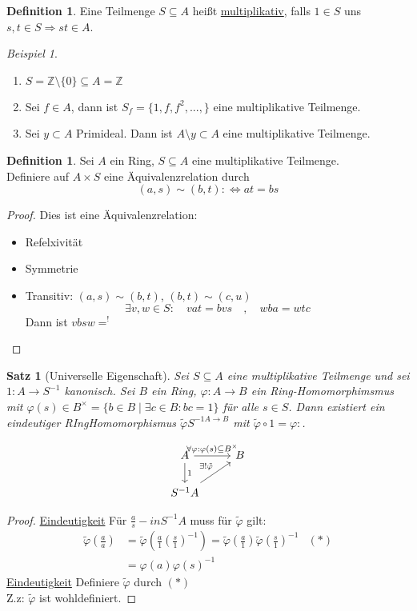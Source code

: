 \documentclass[10pt,a4paper]{article}
\newcommand{\Z}{\ensuremath{\mathbb{Z}}}
\newcounter{thm}[section]
\theoremstyle{definition}
\newtheorem{definition}[thm]{Definition}
\theoremstyle{plain}
\newtheorem{satz}[thm]{Satz}
\theoremstyle{remark}
\newtheorem{exm}[thm]{Beispiel}
\begin{document}
\begin{definition}
	Eine Teilmenge $S\subseteq A$ heißt \underline{multiplikativ}, falls $1\in S$ uns $s,t\in S\Rightarrow st\in A$.
\end{definition}
\begin{exm}
	\begin{enumerate}
		\item $S=\Z\setminus \{0\}\subseteq A=\Z$
		\item Sei $f\in A$, dann ist $S_f=\{1,f,f^2,...,\}$ eine multiplikative Teilmenge.
		\item Sei $y\subset A$ Primideal. Dann ist $A\setminus y\subset A$ eine multiplikative Teilmenge.
	\end{enumerate}
\end{exm}
\begin{definition}
	Sei $A$ ein Ring, $S\subseteq A$ eine multiplikative Teilmenge.\\
	Definiere auf $A\times S$ eine Äquivalenzrelation durch
	\[(a,s)\sim (b,t):\Leftrightarrow at=bs\]
\end{definition}
\begin{proof}
	Dies ist eine Äquivalenzrelation:\begin{itemize}
		\item Refelxivität
		\item Symmetrie
		\item Transitiv: $(a,s)\sim (b,t)$, $(b,t)\sim (c,u)$
		\[\exists v,w\in S:\quad vat=bvs\quad,\quad wba=wtc\]
		Dann ist $vbsw=^!$ %
	\end{itemize}
\end{proof}
\begin{satz}[Universelle Eigenschaft]
	Sei $S\subseteq A$ eine multiplikative Teilmenge und sei $1:A\rightarrow S^{-1}$ kanonisch. Sei $B$ ein Ring, $\varphi:A\rightarrow B$ ein Ring-Homomorphimsmus mit $\varphi(s)\in B^\times=\{b\in B\mid  \exists c\in B: bc=1\}$ für alle $s\in S$. Dann existiert ein eindeutiger RIngHomomorphismus $\tilde{\varphi}S^{-1 A\rightarrow B}$ mit $\tilde{\varphi}\circ 1=\varphi:$.
	
	\[
		\begin{tikzcd}
		A\ar{r}{\forall\varphi:\varphi(s)\subseteq B^\times}\ar{d}{1} & B\\
		S^{-1}A\ar{ru}{\exists!\tilde\varphi} &
		\end{tikzcd}
	\]
\end{satz}
\begin{proof}
	\underline{Eindeutigkeit} Für $\frac{a}{s}-in S^{-1}A$ muss für $\tilde{\varphi}$ gilt:
	\begin{align*}
	\tilde\varphi\left(\frac{a}{a}\right)&=\tilde{\varphi}\left(\frac{a}{1}\left(\frac{s}{1}\right)^{-1}\right)=\tilde{\varphi}\left(\frac{a}{1}\right)\tilde{\varphi}\left(\frac{s}{1}\right)^{-1}&(*)\\
	&=\varphi(a)\varphi(s)^{-1}
	\end{align*}
	\underline{Eindeutigkeit}
	Definiere $\tilde\varphi$ durch $(*)$\\
	Z.z: $\tilde\varphi$ ist wohldefiniert.
\end{proof}
\end{document}
